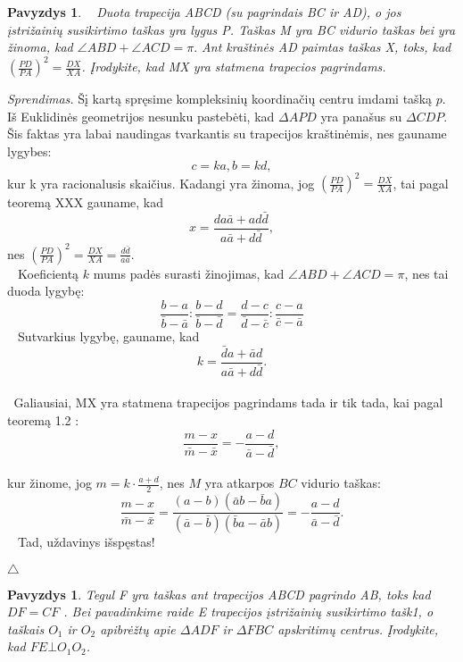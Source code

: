 \documentclass[11pt,a4paper,twoside]{book}
\newenvironment{sprendimas}{\noindent \textit{Sprendimas.}}{\hfill $\triangle$}
\newcounter{foo}[subsection]
\newtheorem{pavnr}[foo]{Pavyzdys}
\theoremstyle{definition} \newtheorem*{api}{Apibrėžimas}
\theoremstyle{remark} \newtheorem*{pastaba}{Pastaba}
\begin{document}
\begin{pavnr}
$\phantom{a}$ Duota trapecija ABCD (su pagrindais BC ir AD), o jos įstrižainių susikirtimo taškas yra lygus P.
  Taškas M yra BC vidurio taškas bei yra žinoma, kad $ \angle ABD + \angle ACD = \pi. $ Ant kraštinės AD paimtas
taškas X, toks, kad $ ( \frac {PD}{PA})^2 = \frac {DX}{XA} $.
 Įrodykite, kad MX yra statmena trapecios pagrindams.
\end{pavnr}
\begin{sprendimas}
 Šį kartą spręsime kompleksinių koordinačių centru imdami tašką $p$. Iš Euklidinės geometrijos
nesunku pastebėti, kad $\Delta APD$ yra panašus su $ \Delta CDP$. Šis faktas yra labai naudingas tvarkantis su trapecijos kraštinėmis, nes gauname lygybes:
$$ c = ka,  b =  kd, $$
 kur k yra racionalusis skaičius.
 Kadangi yra žinoma, jog $ ( \frac {PD}{PA})^2 = \frac {DX}{XA} $, tai pagal teoremą XXX
gauname, kad 
$$ x = \frac { da \bar a + ad \bar d }{ a \bar a + d \bar d},$$
 nes $ ( \frac {PD}{PA})^2 = \frac {DX}{XA} = \frac {d \bar d} {a \bar a} $.
\\$ \phantom{a}$ Koeficientą $k$ mums padės surasti žinojimas, kad $ \angle ABD + \angle ACD = \pi $, 
nes tai duoda lygybę:
 $$ \frac {b-a}{\bar b - \bar a} : \frac { b-d}{\bar b - \bar d} =  \frac {d-c}{\bar d - \bar c} : \frac { c-a}{\bar c- \bar a} $$
$ \phantom{a}$ Sutvarkius lygybę, gauname, kad 
$$ k =  \frac { \bar d a + \bar a d }{a \bar a + d \bar d}. $$
\\ $ \phantom{a}$Galiausiai, MX yra statmena trapecijos pagrindams tada ir tik tada, kai
pagal teoremą 1.2 :
 $$  \frac {m-x}{ \bar m - \bar x} = - \frac {a - d}{ \bar a - \bar d},$$
\\kur žinome, jog $ m = k \cdot \frac { a+d} { 2} $, nes $M$ yra atkarpos $BC$ vidurio taškas:
$$ \frac {m-x}{ \bar m - \bar x}= 
\frac {(a-b)( \bar a b - \bar b a) }{(\bar a- \bar b)( \bar b a - \bar a b) } = - \frac {a - d}{ \bar a - \bar d}.$$
 $ \phantom{a}$ Tad, uždavinys išspęstas!

\end{sprendimas}
\begin{pavnr}

Tegul F yra taškas ant trapecijos ABCD pagrindo AB, toks kad $DF=CF$ . 
Bei pavadinkime raide E trapecijos įstrižainių susikirtimo tašk1, o taškais $O_1$ ir $O_2$
apibrėžtų apie $ \Delta ADF$ ir $\Delta FBC$ apskritimų centrus. 
Įrodykite, kad $ FE \bot O_1 O_2 $.
\end{pavnr}
\end{document}
